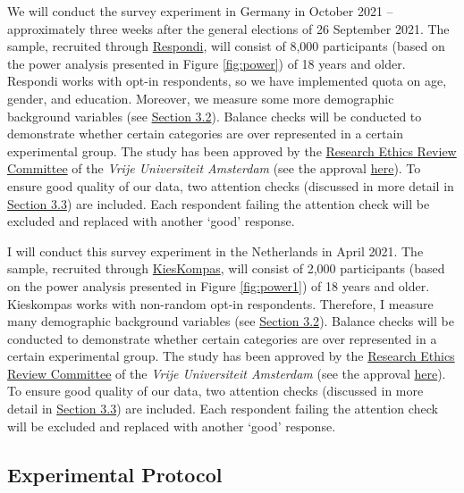 \documentclass[]{article}
\begin{document}
We will conduct the survey experiment in Germany in October 2021 --
approximately three weeks after the general elections of 26 September
2021. The sample, recruited through
\href{https://www.respondi.com/EN/}{Respondi}, will consist of 8,000
participants (based on the power analysis presented in Figure
\ref{fig:power}) of 18 years and older. Respondi works with opt-in
respondents, so we have implemented quota on age, gender, and education.
Moreover, we measure some more demographic background variables (see
\protect\hyperlink{control-variables}{Section 3.2}). Balance checks will
be conducted to demonstrate whether certain categories are over
represented in a certain experimental group. The study has been approved
by the
\href{https://fsw.vu.nl/nl/onderzoek/research-ethics-review/index.aspx}{Research
Ethics Review Committee} of the \textit{Vrije Universiteit Amsterdam}
(see the approval \href{LINK}{here}). To ensure good quality of our
data, two attention checks (discussed in more detail in
\protect\hyperlink{attention-checks}{Section 3.3}) are included. Each
respondent failing the attention check will be excluded and replaced
with another `good' response.

I will conduct this survey experiment in the Netherlands in April 2021.
The sample, recruited through
\href{https://www.kieskompas.nl/en/}{KiesKompas}, will consist of 2,000
participants (based on the power analysis presented in Figure
\ref{fig:power1}) of 18 years and older. Kieskompas works with
non-random opt-in respondents. Therefore, I measure many demographic
background variables (see \protect\hyperlink{control-variables}{Section
3.2}). Balance checks will be conducted to demonstrate whether certain
categories are over represented in a certain experimental group. The
study has been approved by the
\href{https://fsw.vu.nl/nl/onderzoek/research-ethics-review/index.aspx}{Research
Ethics Review Committee} of the \emph{Vrije Universiteit Amsterdam} (see
the approval
\href{https://github.com/MarikenvdVelden/willingness-to-accept-compromises/blob/main/docs/RERC_VU_compromises.pd}{here}).
To ensure good quality of our data, two attention checks (discussed in
more detail in \protect\hyperlink{attention-checks}{Section 3.3}) are
included. Each respondent failing the attention check will be excluded
and replaced with another `good' response.

\hypertarget{experimental-protocol}{%
\subsection{Experimental Protocol}\label{experimental-protocol}}
\end{document}
